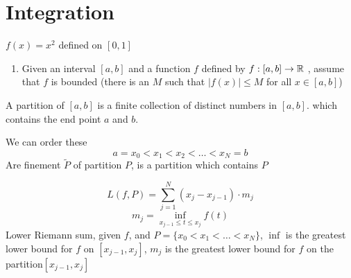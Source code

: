 \chapter{Integration}

\begin{center}

  $f(x) = x^2$ defined on $[0, 1]$
\end{center}

\begin{enumerate}[label=\arabic*.]
  \item Given an interval $[a, b]$ and a function $f$ defined by $f: [a, b] \to \mathbb R$
  , assume that $f$ is bounded (there is an $M$ such that $|f(x)| \leq M$ for all $x \in [a, b]$)
\end{enumerate}

\begin{definition*}
  A partition of $[a, b]$ is a finite collection of distinct numbers in $[a, b]$. 
  which contains the end point $a$ and $b$.

  We can order these 
  $$a = x_0 < x_1 < x_2 < \dotsc < x_N = b$$
  Are finement $\tilde{P}$ of partition $P$, is a partition which contains $P$ 
\end{definition*}

\begin{definition*}
 $$L(f, P) = \sum_{j=1}^N (x_j - x_{j-1})\cdot m_j$$
 $$m_j = \inf_{x_{j-1}\leq t\leq x_j}f(t)$$
  Lower Riemann sum, given $f$, and $P = \{x_0 <x_1 <\dotsc< x_N\}$, 
  $\inf$ is the greatest lower bound for $f$ on $[x_{j-1}, x_j]$,
  $m_j$ is the greatest lower bound for $f$ on the partition$[x_{j-1}, x_j]$
\end{definition*}

